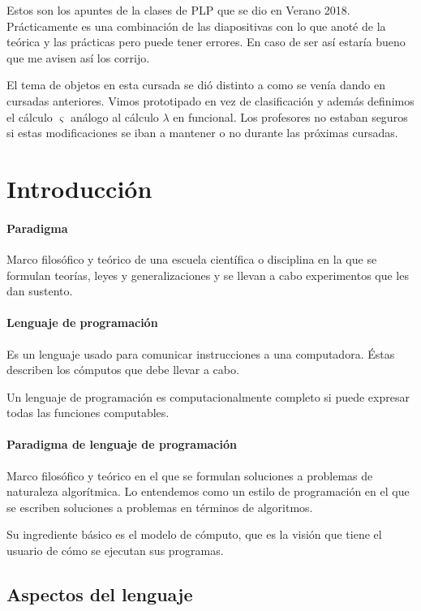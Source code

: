 Estos son los apuntes de la clases de PLP que se dio en Verano 2018. Prácticamente es una combinación de las diapositivas con lo que anoté de la teórica y las prácticas pero puede tener errores. En caso de ser así estaría bueno que me avisen así los corrijo. 

El tema de objetos en esta cursada se dió distinto a como se venía dando en cursadas anteriores. Vimos prototipado en vez de clasificación y además definimos el cálculo $\varsigma$ análogo al cálculo $\lambda$ en funcional. Los profesores no estaban seguros si estas modificaciones se iban a mantener o no durante las próximas cursadas.

\section{Introducción}

\paragraph{Paradigma} Marco filosófico y teórico de una escuela científica o disciplina en la que se formulan teorías, leyes y generalizaciones y se llevan a cabo experimentos que les dan sustento.

\paragraph{Lenguaje de programación} Es un lenguaje usado para comunicar instrucciones a una computadora. Éstas describen los cómputos que debe llevar a cabo.

Un lenguaje de programación es computacionalmente completo si puede expresar todas las funciones computables.

\paragraph{Paradigma de lenguaje de programación} Marco filosófico y teórico en el que se formulan soluciones a problemas de naturaleza algorítmica. Lo entendemos como un estilo de programación en el que se escriben soluciones a problemas en términos de algoritmos.

Su ingrediente básico es el modelo de cómputo, que es la visión que tiene el usuario de cómo se ejecutan sus programas.

\subsection{Aspectos del lenguaje}

